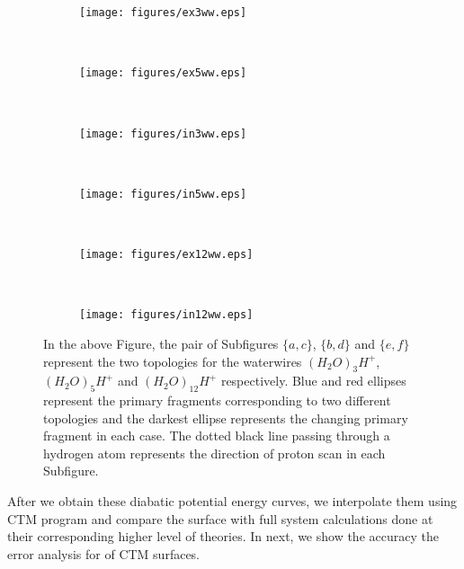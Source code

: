 \begin{figure}[H]
    \begin{subfigure}[t]{0.29\textwidth}
        \texttt{[image: figures/ex3ww.eps]}
        \caption{\label{ex3ww}}
    \end{subfigure}%
    ~
    \begin{subfigure}[t]{0.6\textwidth}
        \hfill\texttt{[image: figures/ex5ww.eps]}
        \caption{\label{ex5ww}}
    \end{subfigure}
    ~
    \begin{subfigure}[t]{0.29\textwidth}
        \texttt{[image: figures/in3ww.eps]}
        \caption{\label{in3ww}}
    \end{subfigure}%
    ~
    \centering
    \begin{subfigure}[t]{0.6\textwidth}
        \hfill\texttt{[image: figures/in5ww.eps]}
        \caption{\label{in5ww}}
    \end{subfigure}
    ~
    \centering
    \begin{subfigure}[t]{0.99\textwidth}
        \texttt{[image: figures/ex12ww.eps]}
        \caption{\label{ex12ww}}
    \end{subfigure}
    ~
    \centering
    \begin{subfigure}[t]{0.99\textwidth}
        \texttt{[image: figures/in12ww.eps]}
        \caption{\label{in12ww}}
    \end{subfigure}
    \caption{\label{waterwireImage} In the above Figure, the pair of Subfigures $\{a,c\}$, $\{b,d\}$ and $\{e,f\}$
    represent the two topologies for the waterwires $(H_{2}O)_{3}H^+$, $(H_{2}O)_{5}H^+$ and $(H_{2}O)_{12}H^+$
    respectively. Blue and red ellipses represent the primary fragments corresponding to two different topologies
    and the darkest ellipse represents the changing primary fragment in each case. The dotted black line passing
    through a hydrogen atom represents the direction of proton scan in each Subfigure.}
\end{figure}


After we obtain these diabatic potential energy curves, we interpolate them using CTM program and compare the
surface with full system calculations done at their corresponding higher level of theories.
In next, we show the accuracy the error analysis for of CTM surfaces.

